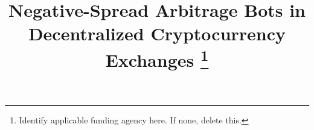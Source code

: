 \documentclass[conference]{IEEEtran}
\begin{document}
\title{Negative-Spread Arbitrage Bots in \\ Decentralized Cryptocurrency Exchanges
\thanks{Identify applicable funding agency here. If none, delete this.}
}

\maketitle
\end{document}
